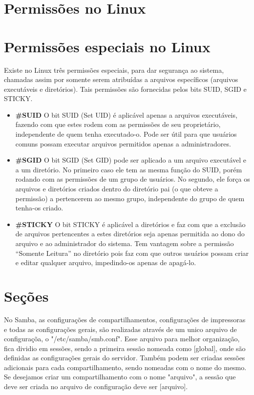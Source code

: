 \section{Permissões no Linux}

\section{Permissões especiais no Linux}

Existe no Linux três permissões especiais, para dar segurança ao sistema, chamadas assim por somente serem atribuídas a arquivos específicos (arquivos executáveis e diretórios). Tais permissões são fornecidas pelos bits SUID, SGID e STICKY.

  \begin{itemize}
    \item \textbf{\#SUID} O bit SUID (Set UID) é aplicável apenas a arquivos executáveis, fazendo com que estes rodem com as permissões de seu proprietário, independente de quem tenha executado-o. Pode ser útil para que usuários comuns possam executar arquivos permitidos apenas a administradores.

    \item \textbf{\#SGID} O bit SGID (Set GID) pode ser aplicado a um arquivo executável e a um diretório. No primeiro caso ele tem as mesma função do SUID, porém rodando com as permissões de um grupo de usuários. No segundo, ele força os arquivos e diretórios criados dentro do diretório pai (o que obteve a permissão) a pertencerem ao mesmo grupo, independente do grupo de quem tenha-os criado.

    \item \textbf{\#STICKY} O bit STICKY é aplicável a diretórios e faz com que a exclusão de arquivos pertencentes a estes diretórios seja apenas permitida ao dono do arquivo e ao administrador do sistema. Tem vantagem sobre a permissão “Somente Leitura” no diretório pois faz com que outros usuários possam criar e editar qualquer arquivo, impedindo-os apenas de apagá-lo.
  \end{itemize}

\section{Seções}

No Samba, as configurações de compartilhamentos, configurações de impressoras e todas as configurações gerais, são realizadas através de um unico arquivo de configuraçõa, o "/etc/samba/smb.conf". Esse arquivo para melhor organização, fica dividio em sessões, sendo a primeira sessão nomeada como [global], onde são definidas as configurações gerais do servidor. Também podem ser criadas sessões adicionais para cada compartilhamento, sendo nomeadas com o nome do mesmo. Se desejamos criar um compartilhamento com o nome "arquivo", a sessão que deve ser criada no arquivo de configuração deve ser [arquivo].


